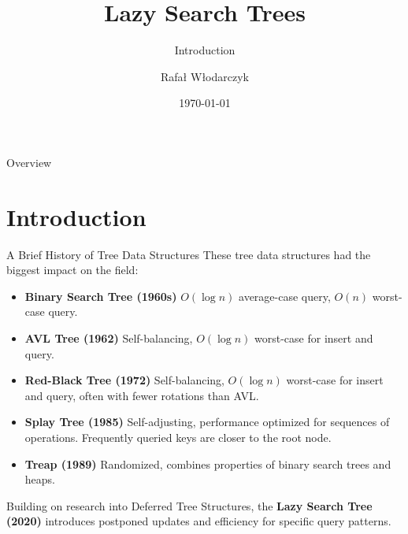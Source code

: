 \documentclass[aspectratio=169,xcolor=dvipsnames]{beamer}
\title{Lazy Search Trees}
\subtitle{Introduction}
\author{Rafał Włodarczyk}
\institute
{
    INA 4
}
\date{\today} %
\begin{document}
\begin{frame}
    \titlepage
\end{frame}

\begin{frame}{Overview}
    \tableofcontents
\end{frame}


\section{Introduction}
\begin{frame}{A Brief History of Tree Data Structures}
    These tree data structures had the biggest impact on the field:
    \begin{itemize}
        \item \textbf{Binary Search Tree (1960s)} $O(\log n)$ average-case query, $O(n)$ worst-case query.
        \item \textbf{AVL Tree (1962)} Self-balancing, $O(\log n)$ worst-case for insert and query.
        \item \textbf{Red-Black Tree (1972)} Self-balancing, $O(\log n)$ worst-case for insert and query, often with fewer rotations than AVL.
        \item \textbf{Splay Tree (1985)} Self-adjusting, performance optimized for sequences of operations. Frequently queried keys are closer to the root node.
        \item \textbf{Treap (1989)} Randomized, combines properties of binary search trees and heaps.
    \end{itemize}
    Building on research into Deferred Tree Structures, the \textbf{Lazy Search Tree (2020)} introduces postponed updates and efficiency for specific query patterns.
\end{frame}

\end{document}
